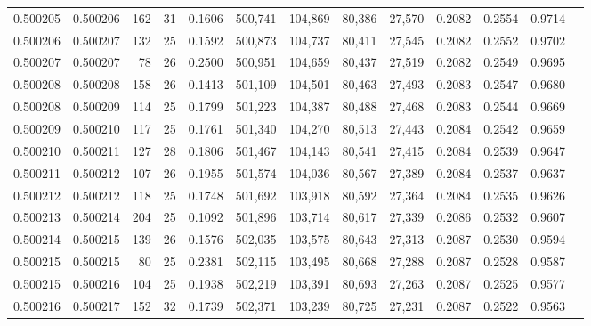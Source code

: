 \begin{tabular}{rrrrrrrrrrrrr}
0.500205 & 0.500206 & 162 &  31 &                                     0.1606 & 500,741 & 104,869 &  80,386 &  27,570 & 0.2082 & 0.2554 & 0.9714 \\
0.500206 & 0.500207 & 132 &  25 &                                     0.1592 & 500,873 & 104,737 &  80,411 &  27,545 & 0.2082 & 0.2552 & 0.9702 \\
0.500207 & 0.500207 &  78 &  26 &                                     0.2500 & 500,951 & 104,659 &  80,437 &  27,519 & 0.2082 & 0.2549 & 0.9695 \\
0.500208 & 0.500208 & 158 &  26 &                                     0.1413 & 501,109 & 104,501 &  80,463 &  27,493 & 0.2083 & 0.2547 & 0.9680 \\
0.500208 & 0.500209 & 114 &  25 &                                     0.1799 & 501,223 & 104,387 &  80,488 &  27,468 & 0.2083 & 0.2544 & 0.9669 \\
0.500209 & 0.500210 & 117 &  25 &                                     0.1761 & 501,340 & 104,270 &  80,513 &  27,443 & 0.2084 & 0.2542 & 0.9659 \\
0.500210 & 0.500211 & 127 &  28 &                                     0.1806 & 501,467 & 104,143 &  80,541 &  27,415 & 0.2084 & 0.2539 & 0.9647 \\
0.500211 & 0.500212 & 107 &  26 &                                     0.1955 & 501,574 & 104,036 &  80,567 &  27,389 & 0.2084 & 0.2537 & 0.9637 \\
0.500212 & 0.500212 & 118 &  25 &                                     0.1748 & 501,692 & 103,918 &  80,592 &  27,364 & 0.2084 & 0.2535 & 0.9626 \\
0.500213 & 0.500214 & 204 &  25 &                                     0.1092 & 501,896 & 103,714 &  80,617 &  27,339 & 0.2086 & 0.2532 & 0.9607 \\
0.500214 & 0.500215 & 139 &  26 &                                     0.1576 & 502,035 & 103,575 &  80,643 &  27,313 & 0.2087 & 0.2530 & 0.9594 \\
0.500215 & 0.500215 &  80 &  25 &                                     0.2381 & 502,115 & 103,495 &  80,668 &  27,288 & 0.2087 & 0.2528 & 0.9587 \\
0.500215 & 0.500216 & 104 &  25 &                                     0.1938 & 502,219 & 103,391 &  80,693 &  27,263 & 0.2087 & 0.2525 & 0.9577 \\
0.500216 & 0.500217 & 152 &  32 &                                     0.1739 & 502,371 & 103,239 &  80,725 &  27,231 & 0.2087 & 0.2522 & 0.9563 \\

\end{tabular}
